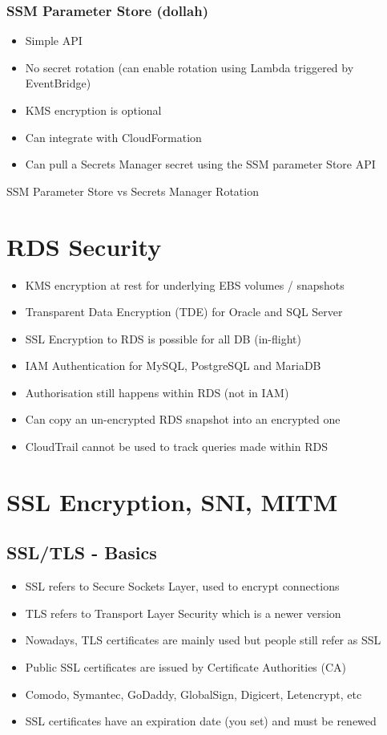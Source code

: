 \subsubsection{SSM Parameter Store (dollah)}
\begin{itemize}
    \item Simple API
    \item No secret rotation (can enable rotation using Lambda triggered by EventBridge)
    \item KMS encryption is optional
    \item Can integrate with CloudFormation
    \item Can pull a Secrets Manager secret using the SSM parameter Store API
\end{itemize}

SSM Parameter Store vs Secrets Manager Rotation


\section{RDS Security}
\begin{itemize}
    \item KMS encryption at rest for underlying EBS volumes / snapshots
    \item Transparent Data Encryption (TDE) for Oracle and SQL Server
    \item SSL Encryption to RDS is possible for all DB (in-flight)
    \item IAM Authentication for MySQL, PostgreSQL and MariaDB
    \item Authorisation still happens within RDS (not in IAM)
    \item Can copy an un-encrypted RDS snapshot into an encrypted one
    \item CloudTrail cannot be used to track queries made within RDS
\end{itemize}


\section{SSL Encryption, SNI, MITM}

\subsection{SSL/TLS - Basics}
\begin{itemize}
    \item SSL refers to Secure Sockets Layer, used to encrypt connections
    \item TLS refers to Transport Layer Security which is a newer version
    \item Nowadays, TLS certificates are mainly used but people still refer as SSL
    \item Public SSL certificates are issued by Certificate Authorities (CA)
    \item Comodo, Symantec, GoDaddy, GlobalSign, Digicert, Letencrypt, etc
    \item SSL certificates have an expiration date (you set) and must be renewed
\end{itemize}

